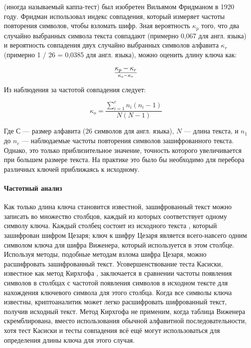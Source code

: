 (иногда называемый каппа-тест) был изобретен Вильямом 
Фридманом в 1920 году. Фридман использовал индекс совпадения, 
который измеряет частоты повторения символов, чтобы взломать 
шифр. Зная вероятность $\kappa_p$ того, что два случайно выбранных 
символа текста совпадают (примерно 0,067 для англ. языка) и вероятность 
совпадения двух случайно выбранных символов алфавита $\kappa_r$ 
(примерно 1 / 26 = 0,0385 для англ. языка), можно оценить длину 
ключа как:

    $${\kappa_p-\kappa_r}\over{\kappa_o-\kappa_r}$$

Из наблюдения за частотой совпадения следует:

    $$\kappa_o=\frac{\sum_{i=1}^{c}n_i(n_i -1)}{N(N-1)}$$

Где $С$ — размер алфавита (26 символов для англ. языка), $N$ — длина 
текста, и $n_1$ до $n_c$ — наблюдаемые частоты повторения символов 
зашифрованного текста. Однако, это только приблизительное значение,
точность которого увеличивается при большем размере текста. 
На практике это было бы необходимо для перебора различных ключей 
приближаясь к исходному.

\paragraph{Частотный анализ}

Как только длина ключа становится известной, зашифрованный текст 
можно записать во множество столбцов, каждый из которых соответствует 
одному символу ключа. Каждый столбец состоит из исходного текста
, который зашифрован шифром Цезаря; ключ к шифру Цезаря является 
всего-навсего одним символом ключа для шифра Виженера, который 
используется в этом столбце. Используя методы, подобные методам 
взлома шифра Цезаря, можно расшифровать зашифрованный текст. 
Усовершенствование теста Касиски, известное как метод Кирхгофа
, заключается в сравнении частоты появления символов в столбцах 
с частотой появления символов в исходном тексте для нахождения 
ключевого символа для этого столбца. Когда все символы ключа 
известны, криптоаналитик может легко расшифровать шифрованный 
текст, получив исходный текст. Метод Кирхгофа не применим, когда 
таблица Виженера скремблирована, вместо использования обычной 
алфавитной последовательности, хотя тест Касиски и тесты совпадения 
всё ещё могут использоваться для определения длины ключа для 
этого случая.
